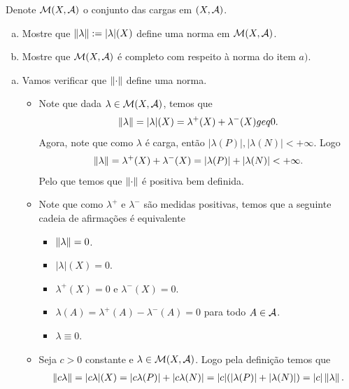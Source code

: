 \begin{homeworkProblem}[2]
  Denote $\mathcal{M}(X,\mathcal{A})$ o conjunto das cargas em $(X,\mathcal{A})$.
  \begin{enumerate}[a)]
    \item Mostre que $\left\|\lambda\right\|:=|\lambda|(X)$ define uma norma em $\mathcal{M}(X,\mathcal{A})$.
    \item Mostre que $\mathcal{M}(X,\mathcal{A})$ é completo com respeito à norma do item $a)$. 
  \end{enumerate}
  \begin{solution}
    \begin{enumerate}[a)]
    \item Vamos verificar que $\left\|\cdot\right\|$ define uma norma.
    \begin{itemize}
      \item Note que dada $\lambda\in\mathcal{M}(X,\mathcal{A})$, temos que
        \begin{align*}
          \left\|\lambda\right\|=|\lambda|(X)=\lambda^{+}(X)+\lambda^{-}(X)\-geq 0.
        \end{align*}
        Agora, note que como $\lambda$ é carga, então $|\lambda(P)|,|\lambda(N)|<+\infty$. Logo
        \begin{align*}
          \left\|\lambda\right\|=\lambda^{+}(X)+\lambda^{-}(X)=|\lambda(P)|+|\lambda(N)|<+\infty.
        \end{align*}
        Pelo que temos que $\left\|\cdot\right\|$ é positiva bem definida.
      \item Note que como $\lambda^{+}$ e $\lambda^{-}$ são medidas positivas, temos que a seguinte cadeia de afirmações é equivalente
        \begin{itemize}
          \item $\left\|\lambda\right\|=0$.
          \item $|\lambda|(X)=0$.
          \item $\lambda^{+}(X)=0$ e $\lambda^{-}(X)=0$.
          \item $\lambda(A)=\lambda^{+}(A)-\lambda^{-}(A)=0$ para todo $A\in\mathcal{A}$.
          \item $\lambda\equiv 0$.
        \end{itemize}
      \item Seja $c>0$ constante e $\lambda\in\mathcal{M}(X,\mathcal{A})$. Logo pela definição temos que
        \begin{align*}
          \left\|c\lambda\right\|=|c\lambda|(X)=|c\lambda(P)|+|c\lambda(N)|=|c|(|\lambda(P)|+|\lambda(N)|)=|c|\left\|\lambda\right\|.
        \end{align*}

\end{itemize}
\end{enumerate}
\end{solution}
\end{homeworkProblem}
